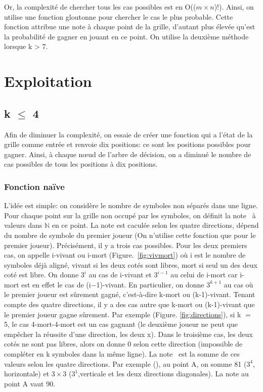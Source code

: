 \documentclass[12pt, a4paper]{article}
\begin{document}
Or, la complexité de chercher tous les cas possibles est en O(($m \times n$)!). Ainsi, on utilise une fonction gloutonne pour chercher le cas le plus probable. Cette fonction attribue une note à chaque point de la grille, d'autant plus élevée qu'est la probabilité de gagner en jouant en ce point.
On utilise la deuxième méthode lorsque k > 7.


\section{Exploitation}
\subsection{k $\le$ 4}
Afin de diminuer la complexité, on essaie de créer une fonction qui a l'état de la grille comme entrée et renvoie dix positions: ce sont les positions possibles pour gagner. Ainsi, à chaque nœud de l'arbre de décision, on a diminué le nombre de cas possibles de tous les positions à dix positions.
\subsubsection{Fonction naïve}
L'idée est simple: on considère le nombre de symboles non séparés dans une ligne. 
Pour chaque point sur la grille non occupé par les symboles, on définit la \og note \fg \ à valeurs dans $\mathbb{N}$ en ce point. La note est caculée selon les quatre directions, dépend du nombre de symbole du premier joueur (On n'utilise cette fonction que pour le premier joueur). Précisément, il y a trois cas possibles. Pour les deux premiers cas, on appelle i-vivant ou i-mort (\mbox{Figure. \ref{fig:vivmort}}) où i est le nombre de symboles déjà aligné, vivant si les deux cotés sont libres, mort si seul un des deux coté est libre. On donne $3^{i}$ au cas de i-vivant et $3^{i-1}$ au celui de i-mort car i-mort est en effet le cas de (i$-$1)-vivant. En particulier, on donne $3^{k+1}$ au cas où le premier joueur est sûrement gagné, c'est-à-dire k-mort ou (k-1)-vivant. Tenant compte des quatre directions, il y a des cas autre que k-mort ou (k-1)-vivant que le premier joueur gagne sûrement. Par exemple (Figure. \ref{fig:directions}), si k $=$ 5, le cas 4-mort-4-mort est un cas gagnant (le deuxième joueur ne peut que empêcher la réussite d'une direction, les deux x). Dans le troisième cas, les deux cotés ne sont pas libres, alors on donne 0 selon cette direction (impossible de compléter en k symboles dans la même ligne). La \og note \fg \ est la somme de ces valeurs selon les quatre directions. Par exemple (), au point A, on somme 81 ($3^{4}$, horizontale) et $3\times 3$ ($3^1$,verticale et les deux directions diagonales). La note au point A vaut 90.\par
\end{document}
